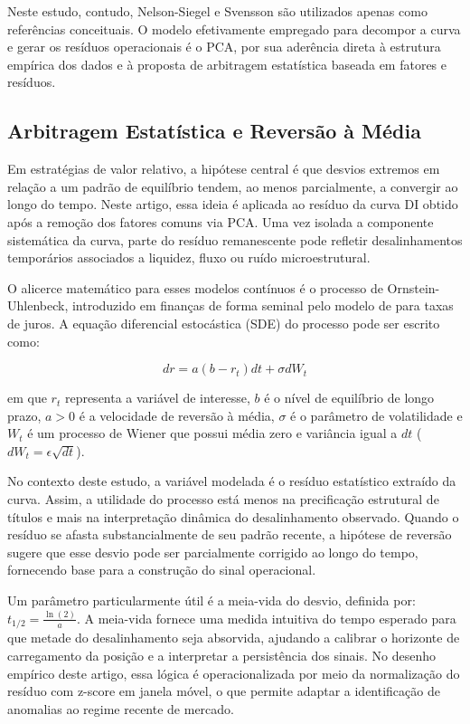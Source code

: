 \documentclass[fleqn]{rbfin}
\begin{document}
Neste estudo, contudo, Nelson-Siegel e Svensson são utilizados apenas como referências conceituais. O modelo efetivamente empregado para decompor a curva e gerar os resíduos operacionais é o PCA, por sua aderência direta à estrutura empírica dos dados e à proposta de arbitragem estatística baseada em fatores e resíduos. 


\subsection{Arbitragem Estatística e Reversão à Média}
Em estratégias de valor relativo, a hipótese central é que desvios extremos em relação a um padrão de equilíbrio tendem, ao menos parcialmente, a convergir ao longo do tempo. Neste artigo, essa ideia é aplicada ao resíduo da curva DI obtido após a remoção dos fatores comuns via PCA. Uma vez isolada a componente sistemática da curva, parte do resíduo remanescente pode refletir desalinhamentos temporários associados a liquidez, fluxo ou ruído microestrutural.

O alicerce matemático para esses modelos contínuos é o processo de Ornstein-Uhlenbeck, introduzido em finanças de forma seminal pelo modelo de \cite{vasicek1977equilibrium} para taxas de juros. A equação diferencial estocástica (SDE) do processo pode ser escrito como:

$$dr = a(b - r_t)dt + \sigma d W_t$$

em que $r_t$ representa a variável de interesse, $b$ é o nível de equilíbrio de longo prazo, $a>0$ é a velocidade de reversão à média, $\sigma$ é o parâmetro de volatilidade e $W_t$ é um processo de Wiener que possui média zero e variância igual a $dt$ ($d W_t = \epsilon \sqrt{dt}$).

No contexto deste estudo, a variável modelada é o resíduo estatístico extraído da curva. Assim, a utilidade do processo está menos na precificação estrutural de títulos e mais na interpretação dinâmica do desalinhamento observado. Quando o resíduo se afasta substancialmente de seu padrão recente, a hipótese de reversão sugere que esse desvio pode ser parcialmente corrigido ao longo do tempo, fornecendo base para a construção do sinal operacional.

Um parâmetro particularmente útil é a meia-vida do desvio, definida por: $t_{1/2} = \frac{\ln(2)}{a}$. A meia-vida fornece uma medida intuitiva do tempo esperado para que metade do desalinhamento seja absorvida, ajudando a calibrar o horizonte de carregamento da posição e a interpretar a persistência dos sinais. No desenho empírico deste artigo, essa lógica é operacionalizada por meio da normalização do resíduo com z-score em janela móvel, o que permite adaptar a identificação de anomalias ao regime recente de mercado.
\end{document}
